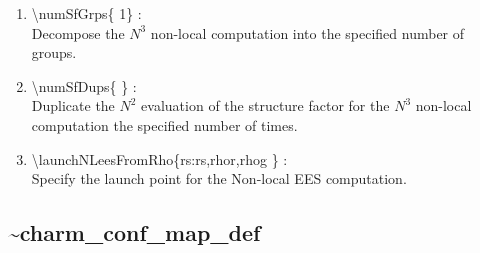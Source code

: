 \documentclass[12pt,titlepage]{article}
\begin{document}
\begin{enumerate}
  \vspace{0.15in} 
  \item \textbackslash numSfGrps\{ 1\} : \\    
  Decompose the $N^3$ non-local computation into the specified number of groups.
  \vspace{0.15in} 
  \item \textbackslash numSfDups\{ \} : \\    
  Duplicate the $N^2$ evaluation of the structure factor for the
  $N^3$ non-local computation the specified number of times.
  \vspace{0.15in} 
  \item \textbackslash launchNLeesFromRho\{rs:rs,rhor,rhog \} : \\  
  Specify the launch point for the Non-local EES computation.
\end{enumerate}

\newpage
\subsection*{\bf \~{ }charm\_conf\_map\_def}
\end{document}

